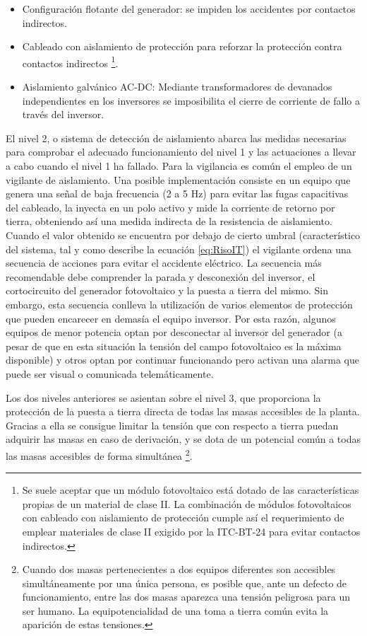 \begin{itemize}
\item Configuración flotante del generador: se impiden los accidentes por
contactos indirectos. 
\item Cableado con aislamiento de protección para reforzar la protección
contra contactos indirectos%
\footnote{Se suele aceptar que un módulo fotovoltaico está dotado de las características
propias de un material de clase II. La combinación de módulos fotovoltaicos
con cableado con aislamiento de protección cumple así el requerimiento
de emplear materiales de clase II exigido por la ITC-BT-24 para evitar
contactos indirectos.%
}. 
\item Aislamiento galvánico AC-DC: Mediante transformadores de devanados
independientes en los inversores se imposibilita el cierre de corriente
de fallo a través del inversor.
\end{itemize}
El nivel 2, o sistema de detección de aislamiento abarca las medidas
necesarias para comprobar el adecuado funcionamiento del nivel 1 y
las actuaciones a llevar a cabo cuando el nivel 1 ha fallado. Para
la vigilancia es común el empleo de un vigilante de aislamiento. Una
posible implementación consiste en un equipo que genera una señal
de baja frecuencia (2 a 5 Hz) para evitar las fugas capacitivas del
cableado, la inyecta en un polo activo y mide la corriente de retorno
por tierra, obteniendo así una medida indirecta de la resistencia
de aislamiento. Cuando el valor obtenido se encuentra por debajo de
cierto umbral (característico del sistema, tal y como describe la
ecuación \ref{eq:RisoIT}) el vigilante ordena una secuencia de acciones
para evitar el accidente eléctrico. La secuencia más recomendable
debe comprender la parada y desconexión del inversor, el cortocircuito
del generador fotovoltaico y la puesta a tierra del mismo. Sin embargo,
esta secuencia conlleva la utilización de varios elementos de protección
que pueden encarecer en demasía el equipo inversor. Por esta razón,
algunos equipos de menor potencia optan por desconectar al inversor
del generador (a pesar de que en esta situación la tensión del campo
fotovoltaico es la máxima disponible) y otros optan por continuar
funcionando pero activan una alarma que puede ser visual o comunicada
telemáticamente.

Los dos niveles anteriores se asientan sobre el nivel 3, que proporciona
la protección de la puesta a tierra directa de todas las masas accesibles
de la planta. Gracias a ella se consigue limitar la tensión que con
respecto a tierra puedan adquirir las masas en caso de derivación,
y se dota de un potencial común a todas las masas accesibles de forma
simultánea%
\footnote{Cuando dos masas pertenecientes a dos equipos diferentes son accesibles
simultáneamente por una única persona, es posible que, ante un defecto
de funcionamiento, entre las dos masas aparezca una tensión peligrosa
para un ser humano. La equipotencialidad de una toma a tierra común
evita la aparición de estas tensiones.%
}.


